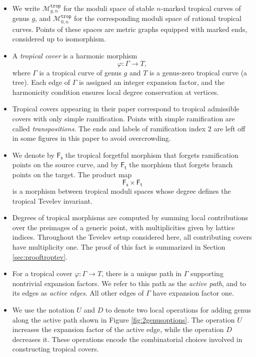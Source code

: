 \documentclass[11pt,reqno]{amsart}
\theoremstyle{definition}
\newcommand\trop{{\mathtt{trop}}}
\newcommand\Mgn[1]{\mathcal M_{#1}}
\newcommand{\Ft}{\mathsf{F_t}}
\newcommand{\Fs}{\mathsf{F_s}}
\begin{document}
\begin{itemize}
    \item We write $\Mgn{g,n}^{\trop}$ for the moduli space of stable $n$-marked tropical curves
    of genus $g$, and $\Mgn{0,n}^{\trop}$ for the corresponding moduli space of rational
    tropical curves. Points of these spaces are metric graphs equipped with marked ends,
    considered up to isomorphism.

    \item A \emph{tropical cover} is a harmonic morphism
    \[
        \varphi \colon \Gamma \to T,
    \]
    where $\Gamma$ is a tropical curve of genus $g$ and $T$ is a genus-zero tropical curve
    (a tree). Each edge of $\Gamma$ is assigned an integer expansion factor, and the
    harmonicity condition ensures local degree conservation at vertices.

    \item Tropical covers appearing in their paper correspond to tropical admissible covers
    with only simple ramification. Points with simple ramification are called \emph{transpositions}. The ends and labels of ramification index $2$ are left off in some figures in this paper to avoid overcrowding.

    \item We denote by $\Fs$ the tropical forgetful morphism that forgets ramification points
    on the source curve, and by $\Ft$ the morphism that forgets branch points on the target.
    The product map
    \[
        \Fs \times \Ft
    \]
    is a morphism between tropical moduli spaces whose degree defines the tropical Tevelev
    invariant.

    \item Degrees of tropical morphisms are computed by summing local contributions over the
    preimages of a generic point, with multiplicities given by lattice indices. Throughout
    the Tevelev setup considered here, all contributing covers have multiplicity one. The proof of this fact is summarized in Section \ref{sec:prooftroptev}.

    \item For a tropical cover $\varphi \colon \Gamma \to T$, there is a unique path in
    $\Gamma$ supporting nontrivial expansion factors. We refer to this path as the
    \emph{active path}, and to its edges as \emph{active edges}. All other edges of $\Gamma$
    have expansion factor one.

    \item We use the notation $U$ and $D$ to denote two local operations for adding genus
    along the active path shown in Figure \ref{fig:2genusoptions}. The operation $U$ increases the expansion factor of the active
    edge, while the operation $D$ decreases it. These operations encode the combinatorial
    choices involved in constructing tropical covers.


\end{itemize}
\end{document}

